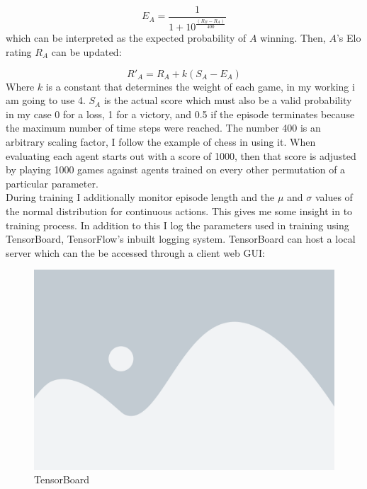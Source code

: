 \begin{equation*}
    E_A = \frac{1}{1+10^{\frac{\left(R_B-R_A\right)}{400}}}
\end{equation*}
\noindent
which can be interpreted as the expected probability of $A$ winning. Then, $A$'s Elo rating $R_A$ can be updated:

\begin{equation*}
    R'_A = R_A + k(S_A-E_A)
\end{equation*}
\noindent
Where $k$ is a constant that determines the weight of each game, in my working i am going to use 4. $S_A$ is the actual score which must also be a valid probability in my case 0 for a loss, 1 for a victory, and 0.5 if the episode terminates because the maximum number of time steps were reached. The number 400 is an arbitrary scaling factor, I follow the example of chess in using it. When evaluating each agent starts out with a score of 1000, then that score is adjusted by playing 1000 games against agents trained on every other permutation of a particular parameter.
\noindent
\\ During training I additionally monitor episode length and the $\mu$ and $\sigma$ values of the normal distribution for continuous actions. This gives me some insight in to training process. In addition to this I log the parameters used in training using TensorBoard, TensorFlow's inbuilt logging system. TensorBoard can host a local server which can the be accessed through a client web GUI:

\begin{figure}[H]
    \centering
    \includegraphics[width=0.6\linewidth]{figures/placeholder.png}
    \caption{TensorBoard}
    \label{fig:tensorboard}
\end{figure}



